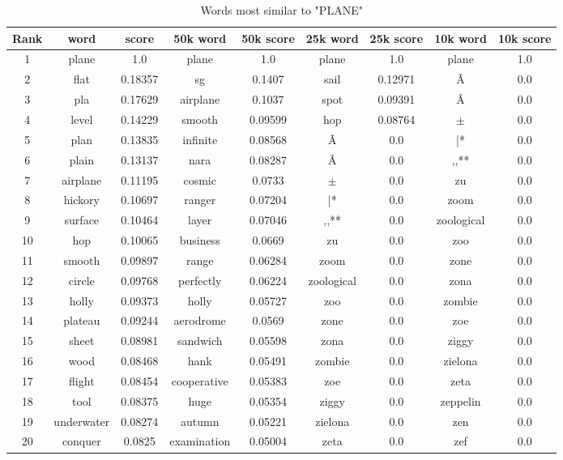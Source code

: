 \documentclass[10pt, a4paper, oneside]{article} %
\begin{document}
\pagebreak

\begin{table}[!h]
\centering
\begin{tabular}{ | c | c | c | | c | c || c | c || c | c |}
\hline
Rank & word & score  & 50k word & 50k score & 25k word & 25k score & 10k word & 10k score\\ \hline
1 & plane & 1.0 &plane & 1.0 &plane & 1.0 &plane & 1.0 \\
2 & flat & 0.18357 &sg & 0.1407 &sail & 0.12971 &Ã & 0.0 \\
3 & pla & 0.17629 &airplane & 0.1037 &spot & 0.09391 &Â & 0.0 \\
4 & level & 0.14229 &smooth & 0.09599 &hop & 0.08764 &$\pm$ & 0.0 \\
5 & plan & 0.13835 &infinite & 0.08568 &Ã & 0.0 &|* & 0.0 \\
6 & plain & 0.13137 &nara & 0.08287 &Â & 0.0 &,,** & 0.0 \\
7 & airplane & 0.11195 &cosmic & 0.0733 &$\pm$ & 0.0 &zu & 0.0 \\
8 & hickory & 0.10697 &ranger & 0.07204 &|* & 0.0 &zoom & 0.0 \\
9 & surface & 0.10464 &layer & 0.07046 &,,** & 0.0 &zoological & 0.0 \\
10 & hop & 0.10065 &business & 0.0669 &zu & 0.0 &zoo & 0.0 \\
11 & smooth & 0.09897 &range & 0.06284 &zoom & 0.0 &zone & 0.0 \\
12 & circle & 0.09768 &perfectly & 0.06224 &zoological & 0.0 &zona & 0.0 \\
13 & holly & 0.09373 &holly & 0.05727 &zoo & 0.0 &zombie & 0.0 \\
14 & plateau & 0.09244 &aerodrome & 0.0569 &zone & 0.0 &zoe & 0.0 \\
15 & sheet & 0.08981 &sandwich & 0.05598 &zona & 0.0 &ziggy & 0.0 \\
16 & wood & 0.08468 &hank & 0.05491 &zombie & 0.0 &zielona & 0.0 \\
17 & flight & 0.08454 &cooperative & 0.05383 &zoe & 0.0 &zeta & 0.0 \\
18 & tool & 0.08375 &huge & 0.05354 &ziggy & 0.0 &zeppelin & 0.0 \\
19 & underwater & 0.08274 &autumn & 0.05221 &zielona & 0.0 &zen & 0.0 \\
20 & conquer & 0.0825 &examination & 0.05004 &zeta & 0.0 &zef & 0.0 \\
 \hline
\end{tabular}
\caption{Words most similar to "PLANE"}
\label{plane}
\end{table}
\end{document}
